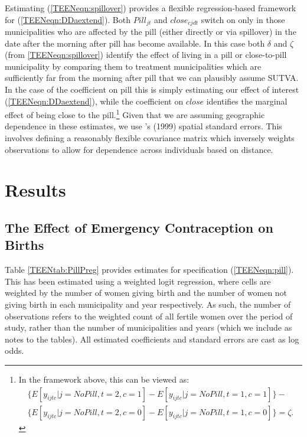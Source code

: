 Estimating (\ref{TEENeqn:spillover}) provides a flexible regression-based 
framework for (\ref{TEENeqn:DDaextend}).  Both $Pill_{jt}$ and $close_{cjdt}$
switch on only in those municipalities who are affected by the pill (either
directly or via spillover) in the date after the morning after pill has become
available.  In this case both $\delta$ and $\zeta$ (from \ref{TEENeqn:spillover}) 
identify the effect of living in a pill or close-to-pill municipality by 
comparing them to treatment municipalities which are sufficiently far from the 
morning after pill that we can plausibly assume SUTVA.  In the case of the 
coefficient on pill this is simply estimating our effect of interest
(\ref{TEENeqn:DDaextend}), while the coefficient on $close$ identifies the 
marginal effect of being close to the pill.\footnote{In the framework above, 
this can be viewed as: 
\begin{equation}
\nonumber
\begin{split}
\{E[y_{ijtc}|j=No Pill,t=2,c=1]- E[y_{ijtc}|j=No Pill,t=1,c=1]\}- \\
\{E[y_{ijtc}|j=No Pill,t=2,c=0]- E[y_{ijtc}|j=No Pill,t=1,c=0]\} = \zeta.
\end{split}
\end{equation}}
Given that we are assuming geographic dependence in these estimates, we use 
\citeauthor{Conley1999}'s (1999) spatial standard errors.  This involves defining 
a reasonably flexible covariance matrix which inversely weights observations to 
allow for dependence across individuals based on distance.

\section{Results}
\label{TEENscn:results}
\subsection{The Effect of Emergency Contraception on Births}
\label{TEENsscn:rbirths}
Table \ref{TEENtab:PillPreg} provides estimates for specification 
(\ref{TEENeqn:pill}).  This has been estimated using a weighted logit regression,
where cells are weighted by the number of women giving birth and the number of
women not giving birth in each municipality and year respectively.  As such, the
number of observations refers to the weighted count of all fertile women over the
period of study, rather than the number of municipalities and years (which we
include as notes to the tables).  All estimated coefficients and standard errors 
are cast as log odds.  

